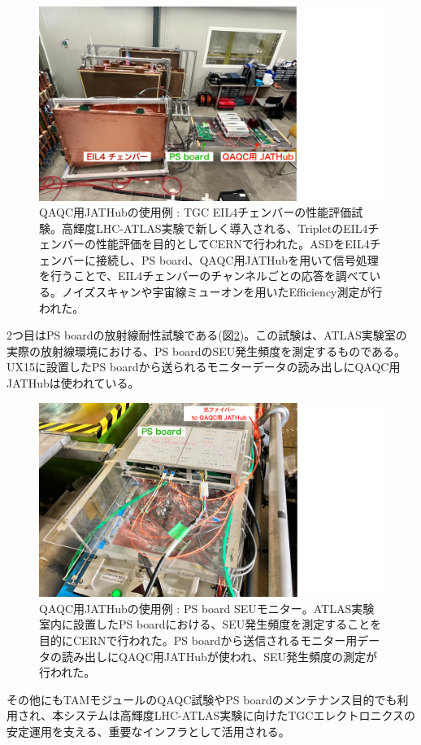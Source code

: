 \begin{figure}
\centering
\includegraphics[width=16cm]{fig/QAQC/JATHubEIL4.pdf}
\caption[QAQC用JATHubの使用例 : EIL4チェンバー試験]{QAQC用JATHubの使用例 : TGC EIL4チェンバーの性能評価試験\cite{mt_wada}。高輝度LHC-ATLAS実験で新しく導入される、TripletのEIL4チェンバーの性能評価を目的としてCERNで行われた。ASDをEIL4チェンバーに接続し、PS board、QAQC用JATHubを用いて信号処理を行うことで、EIL4チェンバーのチャンネルごとの応答を調べている。ノイズスキャンや宇宙線ミューオンを用いたEfficiency測定が行われた。}
\label{JATHubEIL4}
\end{figure}

2つ目はPS boardの放射線耐性試験である(図\ref{JATHubSEU})。この試験は、ATLAS実験室の実際の放射線環境における、PS boardのSEU発生頻度を測定するものである。UX15に設置したPS boardから送られるモニターデータの読み出しにQAQC用JATHubは使われている。

\begin{figure}
\centering
\includegraphics[width=16cm]{fig/QAQC/JATHubSEU.pdf}
\caption[QAQC用JATHubの使用例 : PS board SEUモニター]{QAQC用JATHubの使用例 : PS board SEUモニター\cite{mt_hashimoto}。ATLAS実験室内に設置したPS boardにおける、SEU発生頻度を測定することを目的にCERNで行われた。PS boardから送信されるモニター用データの読み出しにQAQC用JATHubが使われ、SEU発生頻度の測定が行われた。}
\label{JATHubSEU}
\end{figure}

その他にもTAMモジュールのQAQC試験やPS boardのメンテナンス目的でも利用され、本システムは高輝度LHC-ATLAS実験に向けたTGCエレクトロニクスの安定運用を支える、重要なインフラとして活用される。